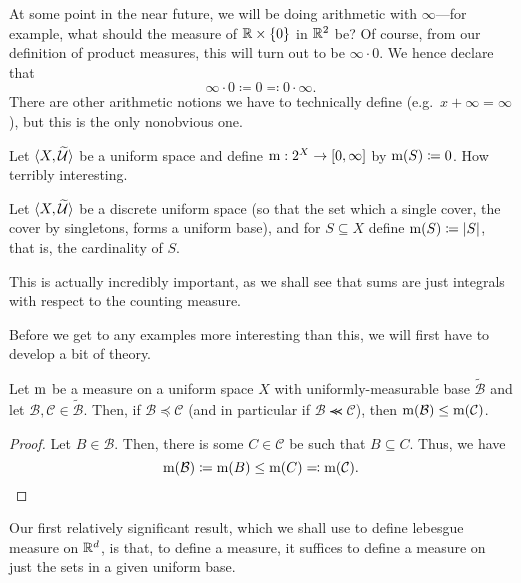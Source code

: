 \begin{displayquote}
At some point in the near future, we will be doing arithmetic with $\infty$---for example, what should the measure of $\mathbb{R} \times \{ 0\}$ in $\mathbb{R} ^2$ be?  Of course, from our definition of product measures, this will turn out to be $\infty \cdot 0$.  We hence declare that
\begin{equation}
\infty \cdot 0\coloneqq 0\eqqcolon 0\cdot \infty .
\end{equation}
There are other arithmetic notions we have to technically define (e.g.~$x+\infty=\infty$), but this is the only nonobvious one.
\end{displayquote}
\begin{exm}
Let $\langle X,\widetilde{\mathcal{U}}\rangle$ be a uniform space and define $\mathrm{m} :2^X\rightarrow [0,\infty ]$ by $\mathrm{m} (S)\coloneqq 0$.  How terribly interesting.
\end{exm}
\begin{exm}
Let $\langle X,\widetilde{\mathcal{U}}\rangle$ be a discrete uniform space (so that the set which a single cover, the cover by singletons, forms a uniform base), and for $S\subseteq X$ define $\mathrm{m} (S)\coloneqq \lvert S\rvert$, that is, the cardinality of $S$.
\begin{rmk}
This is actually incredibly important, as we shall see that sums are just integrals with respect to the counting measure.
\end{rmk}
\end{exm}
Before we get to any examples more interesting than this, we will first have to develop a bit of theory.
\begin{prp}\label{prp5.1.9}
Let $\mathrm{m}$ be a measure on a uniform space $X$ with uniformly-measurable base $\widetilde{\mathcal{B}}$ and let $\mathcal{B},\mathcal{C}\in \widetilde{\mathcal{B}}$.  Then, if $\mathcal{B}\preceq \mathcal{C}$ (and in particular if $\mathcal{B}\llcurly \mathcal{C}$), then $\mathrm{m} (\mathcal{B})\leq \mathrm{m} (\mathcal{C})$.
\begin{proof}
Let $B\in \mathcal{B}$.  Then, there is some $C\in \mathcal{C}$ be such that $B\subseteq C$.  Thus, we have
\begin{equation}
\mathrm{m} (\mathcal{B})\coloneqq \mathrm{m} (B)\leq \mathrm{m} (C)\eqqcolon \mathrm{m} (\mathcal{C}).
\end{equation}
\end{proof}
\end{prp}
Our first relatively significant result, which we shall use to define lebesgue measure on $\mathbb{R} ^d$, is that, to define a measure, it suffices to define a measure on just the sets in a given uniform base.
